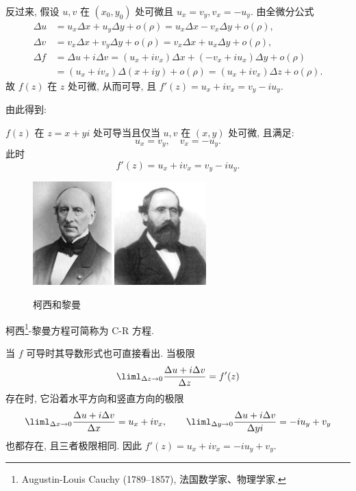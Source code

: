 反过来, 假设 $u,v$ 在 $(x_0,y_0)$ 处可微且 $u_x=v_y, v_x=-u_y$. 由全微分公式
\begin{align*}
  \Delta u&=u_x\Delta x+u_y\Delta y+o(\rho)
    =u_x\Delta x-v_x\Delta y+o(\rho),\\
  \Delta v&=v_x\Delta x+v_y\Delta y+o(\rho)
    =v_x\Delta x+u_x\Delta y+o(\rho),\\
  \Delta f&=\Delta u+i\Delta v
    =(u_x+i v_x)\Delta x+(-v_x+i u_x)\Delta y+o(\rho)\\
   &=(u_x+i v_x)\Delta(x+iy)+o(\rho)
    =(u_x+i v_x)\Delta z+o(\rho).
\end{align*}
故 $f(z)$ 在 $z$ 处可微, 从而可导, 且 $f'(z)=u_x+i v_x=v_y-i u_y$.

由此得到:
\begin{theorem}[柯西-黎曼定理]\label{thm:Cauchy-Riemann}
  $f(z)$ 在 $z=x+yi$ 处可导当且仅当 $u,v$ 在 $(x,y)$ 处可微, 且满足:
    \[u_x=v_y,\quad v_x=-u_y.\]
  此时
    \[f'(z)=u_x+iv_x=v_y-iu_y.\]
\end{theorem}

\begin{figure}[!ht]
  \centering
  \includegraphics[height=40mm]{../image/Cauchy.jpeg}
  \hspace{5em}
  \includegraphics[height=40mm]{../image/Riemann.jpeg}
  \caption{柯西和黎曼}
\end{figure}

柯西\footnote{%
  Augustin-Louis Cauchy (1789--1857), 法国数学家、物理学家.
}-黎曼方程可简称为 C-R 方程.

当 $f$ 可导时其导数形式也可直接看出.
当极限
\[
  \liml_{\Delta z\to 0}\dfrac{\Delta u+i\Delta v}{\Delta z}=f'(z)
\]
存在时, 它沿着水平方向和竖直方向的极限
\[
  \liml_{\Delta x\to 0}\dfrac{\Delta u+i\Delta v}{\Delta x}=u_x+iv_x,\qquad
  \liml_{\Delta y\to 0}\dfrac{\Delta u+i\Delta v}{\Delta y i}=-iu_y+v_y
\]
也都存在, 且三者极限相同.
因此 $f'(z)=u_x+iv_x=-iu_y+v_y$.


